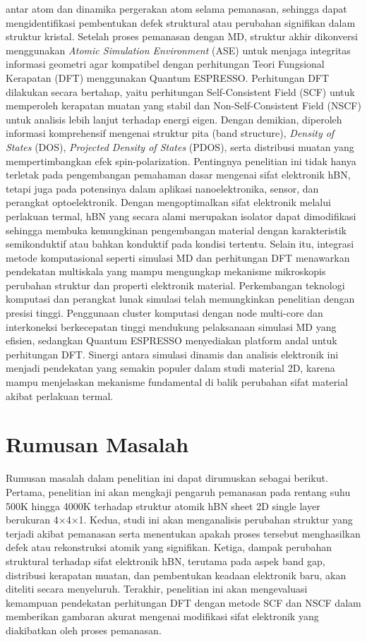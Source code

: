antar atom dan dinamika pergerakan atom selama pemanasan, sehingga dapat mengidentifikasi pembentukan defek struktural atau perubahan signifikan dalam struktur kristal. Setelah proses pemanasan dengan MD, struktur akhir dikonversi menggunakan \textit{Atomic Simulation Environment} (ASE) untuk menjaga integritas informasi geometri agar kompatibel dengan perhitungan Teori Fungsional Kerapatan (DFT) menggunakan Quantum ESPRESSO. Perhitungan DFT dilakukan secara bertahap, yaitu perhitungan Self-Consistent Field (SCF) untuk memperoleh kerapatan muatan yang stabil dan Non-Self-Consistent Field (NSCF) untuk analisis lebih lanjut terhadap energi eigen. Dengan demikian, diperoleh informasi komprehensif mengenai struktur pita (band structure), \textit{Density of States} (DOS), \textit{Projected Density of States} (PDOS), serta distribusi muatan yang mempertimbangkan efek spin-polarization. Pentingnya penelitian ini tidak hanya terletak pada pengembangan pemahaman dasar mengenai sifat elektronik hBN, tetapi juga pada potensinya dalam aplikasi nanoelektronika, sensor, dan perangkat optoelektronik. Dengan mengoptimalkan sifat elektronik melalui perlakuan termal, hBN yang secara alami merupakan isolator dapat dimodifikasi sehingga membuka kemungkinan pengembangan material dengan karakteristik semikonduktif atau bahkan konduktif pada kondisi tertentu. Selain itu, integrasi metode komputasional seperti simulasi MD dan perhitungan DFT menawarkan pendekatan multiskala yang mampu mengungkap mekanisme mikroskopis perubahan struktur dan properti elektronik material. Perkembangan teknologi komputasi dan perangkat lunak simulasi telah memungkinkan penelitian dengan presisi tinggi. Penggunaan cluster komputasi dengan node multi-core dan interkoneksi berkecepatan tinggi mendukung pelaksanaan simulasi MD yang efisien, sedangkan Quantum ESPRESSO menyediakan platform andal untuk perhitungan DFT. Sinergi antara simulasi dinamis dan analisis elektronik ini menjadi pendekatan yang semakin populer dalam studi material 2D, karena mampu menjelaskan mekanisme fundamental di balik perubahan sifat material akibat perlakuan termal. 

\section{Rumusan Masalah}
Rumusan masalah dalam penelitian ini dapat dirumuskan sebagai berikut. Pertama, penelitian ini akan mengkaji pengaruh pemanasan pada rentang suhu 500K hingga 4000K terhadap struktur atomik hBN sheet 2D single layer berukuran 4×4×1. Kedua, studi ini akan menganalisis perubahan struktur yang terjadi akibat pemanasan serta menentukan apakah proses tersebut menghasilkan defek atau rekonstruksi atomik yang signifikan. Ketiga, dampak perubahan struktural terhadap sifat elektronik hBN, terutama pada aspek band gap, distribusi kerapatan muatan, dan pembentukan keadaan elektronik baru, akan diteliti secara menyeluruh. Terakhir, penelitian ini akan mengevaluasi kemampuan pendekatan perhitungan DFT dengan metode SCF dan NSCF dalam memberikan gambaran akurat mengenai modifikasi sifat elektronik yang diakibatkan oleh proses pemanasan. 

